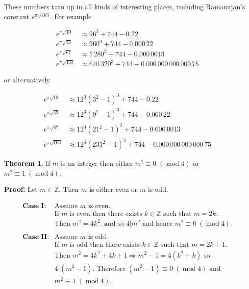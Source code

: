 \documentclass[11pt, oneside]{article}   	%
\theoremstyle{definition}
\newtheorem{thm}{Theorem}[section]
\DeclareMathOperator{\mymod}{\text{mod}}
\begin{document}
\bigskip
\noindent
These numbers turn up in all kinds of interesting places,
including Ramanujan's constant $e^{{\pi {\sqrt {163}}}}$.  For
example 


\begin{center}
\begin{equation*}
\begin{array}{llll} 
e^{{\pi {\sqrt  {19}}}}   &\approx  96^{3} + 744 - 0.22 \\
e^{{\pi {\sqrt  {43}}}}   &\approx 960^{3}+744-0.000\,22\\
e^{{\pi {\sqrt  {67}}}}   &\approx 5\,280^{3}+744-0.000\,0013\\
e^{{\pi {\sqrt  {163}}}} &\approx 640\,320^{3}+744-0.000\,000\,000\,000\,75
\end{array}
\end{equation*}
\end{center}

\noindent
or alternatively

\begin{equation*}
\begin{array}{llll} 
e^{{\pi {\sqrt  {19}}}}   &\approx 12^{3}(3^{2}-1)^{3}+744-0.22    \\
e^{{\pi {\sqrt  {43}}}}   &\approx 12^{3}(9^{2}-1)^{3}+744-0.000\,22\\
e^{{\pi {\sqrt  {67}}}}   &\approx 12^{3}(21^{2}-1)^{3}+744-0.000\,0013\\
e^{{\pi {\sqrt  {163}}}} &\approx 12^{3}(231^{2}-1)^{3}+744-0.000\,000\,000\,000\,75
\end{array}
\end{equation*}


\bigskip
\begin{thm}
If $m$ is an integer then either $m^2 \equiv 0 \; (\mymod 4)$ or $m^2 \equiv 1 \; (\mymod 4)$.
\end{thm}

\bigskip
\noindent \textbf{Proof:} Let $m \in \mathbb{Z}$. Then $m$ is either even or $m$ is odd.

\begin{equation*}
\begin{array}{llll} 
\textbf{Case I:}    
& \text{Assume $m$ is even.} \\
& \text{If $m$ is even then there exists $k \in \mathbb{Z}$ such that $m = 2k$.} \\
& \text{Then $m^2 = 4k^2$, and so $4 \lvert m^2$ and hence $m^2 \equiv 0 \; (\mymod 4)$.} \\ \\
\textbf{Case II:}    
& \text{Assume $m$ is odd.} \\
& \text{If $m$ is odd then there exists $k \in \mathbb{Z}$ such that $m = 2k + 1$.} \\
& \text{Then $m^2 = 4k^2 +4k + 1 \Rightarrow m^2 - 1 = 4(k^2 + k)$ so}                       \\
& \text{$4 \lvert (m^2 - 1)$.  Therefore $(m^2 - 1)  \equiv 0 \; (\mymod 4)$ and}      \\
&m^2 \equiv 1 \; (\mymod 4).
\end{array}
\end{equation*}
\end{document}
